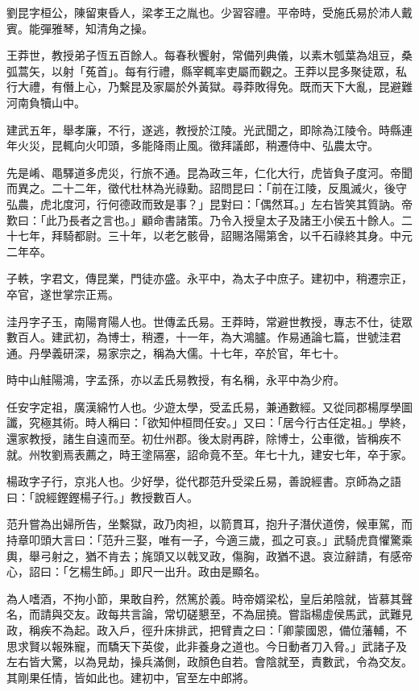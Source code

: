 \begin{pinyinscope}
劉昆字桓公，陳留東昏人，梁孝王之胤也。少習容禮。平帝時，受施氏易於沛人戴賓。能彈雅琴，知清角之操。

王莽世，教授弟子恆五百餘人。每春秋饗射，常備列典儀，以素木瓠葉為俎豆，桑弧蒿矢，以射「菟首」。每有行禮，縣宰輒率吏屬而觀之。王莽以昆多聚徒眾，私行大禮，有僭上心，乃繫昆及家屬於外黃獄。尋莽敗得免。既而天下大亂，昆避難河南負犢山中。

建武五年，舉孝廉，不行，遂逃，教授於江陵。光武聞之，即除為江陵令。時縣連年火災，昆輒向火叩頭，多能降雨止風。徵拜議郎，稍遷侍中、弘農太守。

先是崤、黽驛道多虎災，行旅不通。昆為政三年，仁化大行，虎皆負子度河。帝聞而異之。二十二年，徵代杜林為光祿勳。詔問昆曰：「前在江陵，反風滅火，後守弘農，虎北度河，行何德政而致是事？」昆對曰：「偶然耳。」左右皆笑其質訥。帝歎曰：「此乃長者之言也。」顧命書諸策。乃令入授皇太子及諸王小侯五十餘人。二十七年，拜騎都尉。三十年，以老乞骸骨，詔賜洛陽第舍，以千石祿終其身。中元二年卒。

子軼，字君文，傳昆業，門徒亦盛。永平中，為太子中庶子。建初中，稍遷宗正，卒官，遂世掌宗正焉。

洼丹字子玉，南陽育陽人也。世傳孟氏易。王莽時，常避世教授，專志不仕，徒眾數百人。建武初，為博士，稍遷，十一年，為大鴻臚。作易通論七篇，世號洼君通。丹學義研深，易家宗之，稱為大儒。十七年，卒於官，年七十。

時中山觟陽鴻，字孟孫，亦以孟氏易教授，有名稱，永平中為少府。

任安字定祖，廣漢綿竹人也。少遊太學，受孟氏易，兼通數經。又從同郡楊厚學圖讖，究極其術。時人稱曰：「欲知仲桓問任安。」又曰：「居今行古任定祖。」學終，還家教授，諸生自遠而至。初仕州郡。後太尉再辟，除博士，公車徵，皆稱疾不就。州牧劉焉表薦之，時王塗隔塞，詔命竟不至。年七十九，建安七年，卒于家。

楊政字子行，京兆人也。少好學，從代郡范升受梁丘易，善說經書。京師為之語曰：「說經鏗鏗楊子行。」教授數百人。

范升嘗為出婦所告，坐繫獄，政乃肉袒，以箭貫耳，抱升子潛伏道傍，候車駕，而持章叩頭大言曰：「范升三娶，唯有一子，今適三歲，孤之可哀。」武騎虎賁懼驚乘輿，舉弓射之，猶不肯去；旄頭又以戟叉政，傷胸，政猶不退。哀泣辭請，有感帝心，詔曰：「乞楊生師。」即尺一出升。政由是顯名。

為人嗜酒，不拘小節，果敢自矜，然篤於義。時帝婿梁松，皇后弟陰就，皆慕其聲名，而請與交友。政每共言論，常切磋懇至，不為屈撓。嘗詣楊虛侯馬武，武難見政，稱疾不為起。政入戶，徑升床排武，把臂責之曰：「卿蒙國恩，備位藩輔，不思求賢以報殊寵，而驕天下英俊，此非養身之道也。今日動者刀入脅。」武諸子及左右皆大驚，以為見劫，操兵滿側，政顏色自若。會陰就至，責數武，令為交友。其剛果任情，皆如此也。建初中，官至左中郎將。


\end{pinyinscope}
